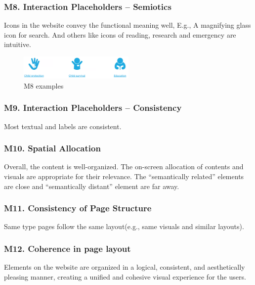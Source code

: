 \subsubsection*{M8. Interaction Placeholders – Semiotics}
Icons in the website convey the functional meaning well, E.g.,  A magnifying glass icon for search. And others like icons of reading, research and emergency are intuitive.
\begin{figure}[H]
	\centering
	\includegraphics[width=0.5\textwidth]{Images/yan_m8.png}
	\caption{M8 examples}
	\label{fig:m8}
\end{figure}

\subsubsection*{M9. Interaction Placeholders – Consistency}
Most textual and labels are consistent.

\subsubsection*{M10. Spatial Allocation}
Overall, the content is well-organized. The on-screen allocation of contents and visuals are appropriate for their relevance. The “semantically related” elements are close and “semantically distant” element are far away.

\subsubsection*{M11. Consistency of Page Structure}
Same type pages follow the same layout(e.g., same visuals and similar layouts).

\subsubsection*{M12. Coherence in page layout}
Elements on the website are organized in a logical, consistent, and aesthetically pleasing manner, creating a unified and cohesive visual experience for the users.
 	 




